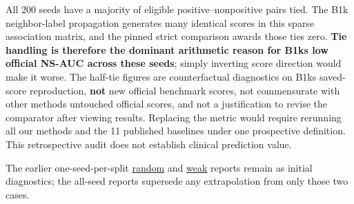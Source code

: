 \documentclass[
  10pt,
]{ctexart}
\begin{document}
All 200 seeds have a majority of eligible positive--nonpositive pairs
tied. The B1k neighbor-label propagation generates many identical scores
in this sparse association matrix, and the pinned strict comparison
awards those ties zero. \textbf{Tie handling is therefore the dominant
arithmetic reason for B1k\textquotesingle s low official NS-AUC across
these seeds}; simply inverting score direction would make it worse. The
half-tie figures are counterfactual diagnostics on B1k\textquotesingle s
saved-score reproduction, \textbf{not} new official benchmark scores,
not commensurate with other methods\textquotesingle{} untouched official
scores, and not a justification to revise the comparator after viewing
results. Replacing the metric would require rerunning all our methods
and the 11 published baselines under one prospective definition. This
retrospective audit does not establish clinical prediction value.

The earlier one-seed-per-split
\href{../benchmark/results/b1k_ns_auc_random_seed0_diagnostic.json}{random}
and
\href{../benchmark/results/b1k_ns_auc_weak_seed0_diagnostic.json}{weak}
reports remain as initial diagnostics; the all-seed reports supersede
any extrapolation from only those two cases.
\end{document}
